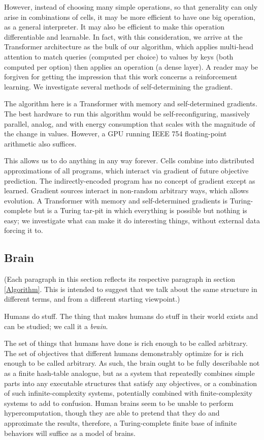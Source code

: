 \documentclass{article}
\begin{document}
However, instead of choosing many simple operations, so that generality can only arise in combinations of cells, it may be more efficient to have one big operation, as a general interpreter. It may also be efficient to make this operation differentiable and learnable. In fact, with this consideration, we arrive at the Transformer architecture \cite{vaswani2017attention} as the bulk of our algorithm, which applies multi-head attention to match queries (computed per choice) to values by keys (both computed per option) then applies an operation (a dense layer). A reader may be forgiven for getting the impression that this work concerns a reinforcement learning. We investigate several methods of self-determining the gradient.

The algorithm here is a Transformer with memory and self-determined gradients. The best hardware to run this algorithm would be self-reconfiguring, massively parallel, analog, and with energy consumption that scales with the magnitude of the change in values. However, a GPU running IEEE 754 floating-point arithmetic also suffices.

This allows us to do anything in any way forever. Cells combine into distributed approximations of all programs, which interact via gradient of future objective prediction. The indirectly-encoded program has no concept of gradient except as learned. Gradient sources interact in non-random arbitrary ways, which allows evolution. A Transformer with memory and self-determined gradients is Turing-complete but is a Turing tar-pit \cite{10.1145/947955.1083808} in which everything is possible but nothing is easy; we investigate what can make it do interesting things, without external data forcing it to.

\subsection{Brain}

(Each paragraph in this section reflects its respective paragraph in section \ref{Algorithm}. This is intended to suggest that we talk about the same structure in different terms, and from a different starting viewpoint.)

Humans do stuff. The thing that makes humans do stuff in their world exists and can be studied; we call it a \textit{brain}.

The set of things that humans have done is rich enough to be called arbitrary. The set of objectives that different humans demonstrably optimize for is rich enough to be called arbitrary. As such, the brain ought to be fully describable not as a finite hash-table analogue, but as a system that repeatedly combines simple parts into any executable structures that satisfy any objectives, or a combination of such infinite-complexity systems, potentially combined with finite-complexity systems to add to confusion. Human brains seem to be unable to perform hypercomputation, though they are able to pretend that they do and approximate the results, therefore, a Turing-complete finite base of infinite behaviors will suffice as a model of brains.
\end{document}
